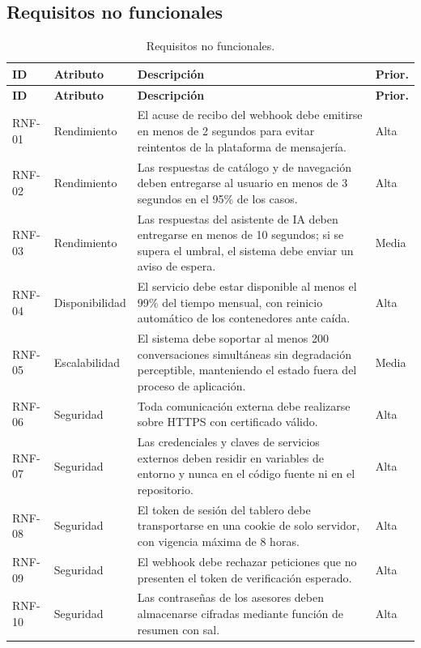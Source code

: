 \documentclass[12pt,a4paper]{report}
\newcommand{\tablacompacta}{\setstretch{1.1}\small}
\newcommand{\cabecera}[1]{\rowcolor{filacabecera}#1}
\begin{document}
\subsection{Requisitos no funcionales}

{\tablacompacta
\begin{longtable}{p{1.6cm}p{3.1cm}p{7.4cm}p{1.4cm}}
\caption{Requisitos no funcionales.}\label{tab:rnf}\\
\toprule
\cabecera{\textbf{ID}} & \textbf{Atributo} & \textbf{Descripción} & \textbf{Prior.} \\
\midrule
\endfirsthead
\toprule
\textbf{ID} & \textbf{Atributo} & \textbf{Descripción} & \textbf{Prior.} \\
\midrule
\endhead
\bottomrule
\endfoot
RNF-01 & Rendimiento & El acuse de recibo del webhook debe emitirse en menos de 2 segundos para evitar reintentos de la plataforma de mensajería. & Alta \\
RNF-02 & Rendimiento & Las respuestas de catálogo y de navegación deben entregarse al usuario en menos de 3 segundos en el 95\% de los casos. & Alta \\
RNF-03 & Rendimiento & Las respuestas del asistente de IA deben entregarse en menos de 10 segundos; si se supera el umbral, el sistema debe enviar un aviso de espera. & Media \\
RNF-04 & Disponibilidad & El servicio debe estar disponible al menos el 99\% del tiempo mensual, con reinicio automático de los contenedores ante caída. & Alta \\
RNF-05 & Escalabilidad & El sistema debe soportar al menos 200 conversaciones simultáneas sin degradación perceptible, manteniendo el estado fuera del proceso de aplicación. & Media \\
RNF-06 & Seguridad & Toda comunicación externa debe realizarse sobre HTTPS con certificado válido. & Alta \\
RNF-07 & Seguridad & Las credenciales y claves de servicios externos deben residir en variables de entorno y nunca en el código fuente ni en el repositorio. & Alta \\
RNF-08 & Seguridad & El token de sesión del tablero debe transportarse en una cookie de solo servidor, con vigencia máxima de 8 horas. & Alta \\
RNF-09 & Seguridad & El webhook debe rechazar peticiones que no presenten el token de verificación esperado. & Alta \\
RNF-10 & Seguridad & Las contraseñas de los asesores deben almacenarse cifradas mediante función de resumen con sal. & Alta \\

\end{longtable}}
\end{document}
